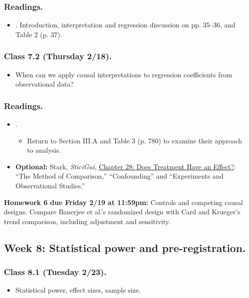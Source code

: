 \documentclass[letterpaper, 12pt, parskip=full,DIV=10]{scrartcl}
\begin{document}
\subsubsection*{Readings.}
\begin{itemize}
\item {}. Introduction, interpretation and regression discussion on pp. 35--36, and Table 2 (p. 37).
\end{itemize}

\subsubsection*{Class 7.2 (Thursday 2/18).}
\begin{itemize}
\item When can we apply causal interpretations to regression coefficients from observational data?
\end{itemize}

\subsubsection*{Readings.}
\begin{itemize}
\item {}.
\begin{itemize}
\item Return to Section III.A and Table 3 (p. 780) to examine their approach to analysis.
\end{itemize}
\item \textbf{Optional:} Stark, \textit{SticiGui}, \href{https://www.stat.berkeley.edu/~stark/SticiGui/Text/experiments.htm}{Chapter 28: Does Treatment Have an Effect?}: ``The Method of Comparison,'' ``Confounding'' and ``Experiments and Observational Studies.''
\end{itemize}

\textbf{Homework 6 due Friday 2/19 at 11:59pm:}
Controls and competing causal designs. Compare Banerjee et al.'s randomized design with Card and Krueger's trend comparison, including adjustment and sensitivity.

\subsection*{Week 8: Statistical power and pre-registration.}
\subsubsection*{Class 8.1 (Tuesday 2/23).}
\begin{itemize}
\item Statistical power, effect sizes, sample size.
\end{itemize}
\end{document}
